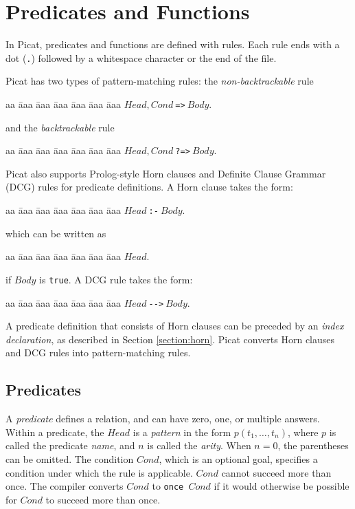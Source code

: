 \chapter{\label{chapter:predicates}Predicates and Functions}
In Picat, predicates and functions are defined with rules. Each rule ends with a dot (\verb+.+) followed by a whitespace character or the end of the file.

Picat has two types of pattern-matching rules: the \emph{non-backtrackable} rule 
\begin{tabbing}
aa \= aaa \= aaa \= aaa \= aaa \= aaa \= aaa \kill
\> \> $Head, Cond\ $\verb+=>+$\ Body$. 
\end{tabbing}
and the \emph{backtrackable} rule 
\begin{tabbing}
aa \= aaa \= aaa \= aaa \= aaa \= aaa \= aaa \kill
\> \> $Head, Cond\ $\verb+?=>+$\ Body$. 
\end{tabbing}
Picat also supports Prolog-style Horn clauses  and Definite Clause Grammar (DCG) rules  for predicate definitions. A Horn clause takes the form:
\begin{tabbing}
aa \= aaa \= aaa \= aaa \= aaa \= aaa \= aaa \kill
\> \> $Head\ $\verb+:-+$\ Body$. 
\end{tabbing}
which can be written as 
\begin{tabbing}
aa \= aaa \= aaa \= aaa \= aaa \= aaa \= aaa \kill
\> \> $Head$. 
\end{tabbing}
if $Body$ is \texttt{true}. A DCG rule takes the form:
\begin{tabbing}
aa \= aaa \= aaa \= aaa \= aaa \= aaa \= aaa \kill
\> \> $Head\ $\verb+-->+$\ Body$. 
\end{tabbing}
A predicate definition that consists of Horn clauses can be preceded by an \emph{index declaration}, as described in Section \ref{section:horn}. Picat converts Horn clauses and DCG rules into pattern-matching rules.

\section{Predicates}
A \emph{predicate} defines a relation, and can have zero, one, or multiple answers. Within a predicate, the $Head$ is a \emph{pattern} in the form $p(t_1, \ldots, t_n)$, where $p$ is called the predicate \emph{name}, and $n$ is called the \emph{arity}. When $n = 0$, the parentheses can be omitted. The condition $Cond$, which is an optional goal, specifies a condition under which the rule is applicable. $Cond$ cannot succeed more than once. The compiler converts $Cond$ to \texttt{once $Cond$} if it would otherwise be possible for $Cond$ to succeed more than once.

